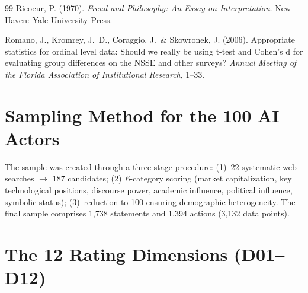 \documentclass[12pt,a4paper]{article}
\begin{document}
\begin{thebibliography}{99}
  Ricoeur, P. (1970).
  \textit{Freud and Philosophy: An Essay on Interpretation}.
  New Haven: Yale University Press.

  Romano, J., Kromrey, J.~D., Coraggio, J.~\& Skowronek, J. (2006).
  Appropriate statistics for ordinal level data: Should we really be using t-test and Cohen's d for evaluating group differences on the NSSE and other surveys?
  \textit{Annual Meeting of the Florida Association of Institutional Research}, 1--33.

\end{thebibliography}



\newpage
\appendix

\section{Sampling Method for the 100 AI Actors}
\label{app:sampling}

The sample was created through a three-stage procedure: (1)~22 systematic web searches $\to$ 187 candidates; (2)~6-category scoring (market capitalization, key technological positions, discourse power, academic influence, political influence, symbolic status); (3)~reduction to 100 ensuring demographic heterogeneity. The final sample comprises 1,738 statements and 1,394 actions (3,132 data points).


\section{The 12 Rating Dimensions (D01--D12)}
\label{app:dimensionen}
\end{document}
